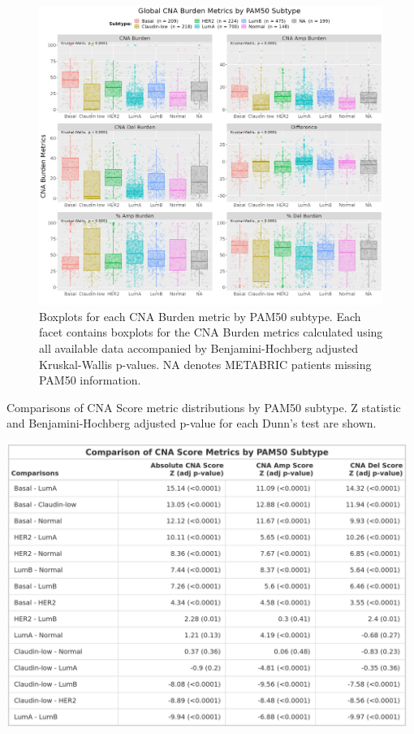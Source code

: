 \begin{figure}[!ht]
\center
\includegraphics[width=1\textwidth]{../figures/Chapter_2/Global_CNA_Burden_Metrics_Across_PAM50.png}
\caption[Boxplots for each CNA Burden metric by PAM50 subtype.]{Boxplots for each CNA Burden metric by PAM50 subtype. Each facet contains boxplots for the CNA Burden metrics calculated using all available data accompanied by Benjamini-Hochberg adjusted Kruskal-Wallis p-values. NA denotes METABRIC patients missing PAM50 information.}
\label{fig:CNA-Burden-Metric-Boxplots-P50}
\end{figure}

\begin{table}[!ht]
\center
\caption[Comparisons of CNA Score metric distributions by PAM50 subtype.]{Comparisons of CNA Score metric distributions by PAM50 subtype. Z statistic and Benjamini-Hochberg adjusted p-value for each Dunn's test are shown.}
\includegraphics[width=0.98\textwidth]{../tables/Chapter_2/Global_CNA_Score_Metric_Comparisons.png}
\label{tab:DT_Score_1}
\end{table}

